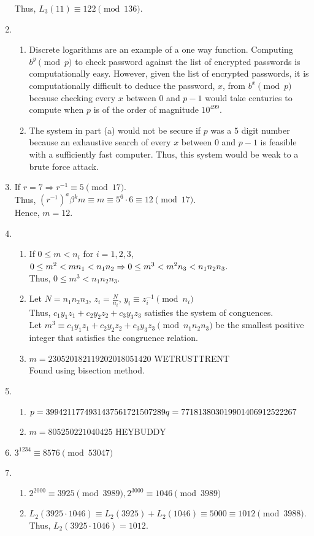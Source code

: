 \documentclass[10pt]{article}
\begin{document}
\begin{enumerate}[label= \arabic*.]
    Thus, $L_3(11)\equiv 122\pmod{136}$.
    \item \begin{enumerate}
        \item Discrete logarithms are an example of a one way function. Computing $b^y\pmod{p}$ to check password against the list of encrypted passwords is computationally easy. 
        However, given the list of encrypted passwords, it is computationally difficult to deduce the password, $x$, from $b^x\pmod{p}$ because checking every $x$ between $0$ and $p-1$ would take centuries to compute when $p$ is of the order of magnitude $10^{499}$.
        \item The system in part (a) would not be secure if $p$ was a $5$ digit number because an exhaustive search of every $x$ between $0$ and $p-1$ is feasible with a sufficiently fast computer. Thus, this system would be weak to a brute force attack.
    \end{enumerate}
    \item If $r=7\Rightarrow r^{-1}\equiv 5\pmod{17}$.\\
    Thus, ${(r^{-1})}^a\beta^k m\equiv m\equiv 5^6\cdot 6\equiv 12\pmod{17}$.\\
    Hence, $m=12$.
    \item \begin{enumerate}
        \item If $0\le m<n_i$ for $i=1,2,3$, 
        $0\le m^2<mn_1<n_1n_2\\
        \Rightarrow 0\le m^3<m^2n_3<n_1n_2n_3$.\\
        Thus, $0\le m^3<n_1n_2n_3$.
        \item Let $N=n_1n_2n_3$,
        $z_i=\frac{N}{n_i}$,
        $y_i\equiv z_i^{-1}\pmod{n_i}$\\
        Thus, $c_1y_1z_1+c_2y_2z_2+c_3y_3z_3$ satisfies the system of conguences.\\
        Let $m^3\equiv c_1y_1z_1+c_2y_2z_2+c_3y_3z_3\pmod{n_1n_2n_3}$ be the smallest positive integer that satisfies the congruence relation.
        \item $m=230520182119202018051420$ WETRUSTTRENT\\ Found using bisection method.
    \end{enumerate}
    \item \begin{enumerate}
        \item $p=3994211774931437561721507289\\ q=771813803019901406912522267$
        \item $m=805250221040425$ HEYBUDDY
    \end{enumerate}
    \item $3^{1234}\equiv 8576\pmod{53047}$
    \item\begin{enumerate}
        \item $2^{2000}\equiv 3925\pmod{3989},2^{3000}\equiv1046\pmod{3989}$
        \item $L_2(3925\cdot 1046)\equiv L_2(3925)+L_2(1046)\equiv 5000\equiv1012\pmod{3988}$.
        Thus, $L_2(3925\cdot 1046)=1012$.
    \end{enumerate}
\end{enumerate}

\end{document}
